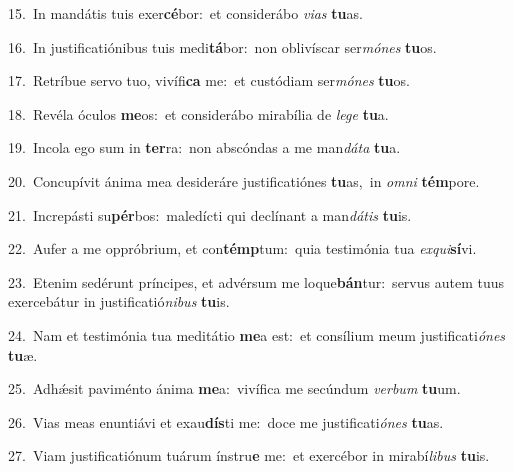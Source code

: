 {\numbfont\textcolor{\numbcolor}{15.}}~In mandátis tuis exer\-\textbf{cé}\-bor:~\star et considerábo \textit{vi}\-\textit{as} \textbf{tu}\-as.\par
{\numbfont\textcolor{\numbcolor}{16.}}~In justificatiónibus tuis medi\-\textbf{tá}\-bor:~\star non oblivíscar ser\-\textit{mó}\-\textit{nes} \textbf{tu}\-os.\par
{\numbfont\textcolor{\numbcolor}{17.}}~Retríbue servo tuo, vivífi\textbf{ca} me:~\star et custódiam ser\-\textit{mó}\-\textit{nes} \textbf{tu}\-os.\par
{\numbfont\textcolor{\numbcolor}{18.}}~Revéla óculos \textbf{me}\-os:~\star et considerábo mirabília de \textit{le}\-\textit{ge} \textbf{tu}\-a.\par
{\numbfont\textcolor{\numbcolor}{19.}}~Incola ego sum in \textbf{ter}\-ra:~\star non abscóndas a me man\-\textit{dá}\-\textit{ta} \textbf{tu}\-a.\par
{\numbfont\textcolor{\numbcolor}{20.}}~Concupívit ánima mea desideráre justificatiónes \textbf{tu}\-as,~\star in \textit{om}\-\textit{ni} \textbf{tém}\-pore.\par
{\numbfont\textcolor{\numbcolor}{21.}}~Increpásti su\-\textbf{pér}\-bos:~\star maledícti qui declínant a man\-\textit{dá}\-\textit{tis} \textbf{tu}\-is.\par
{\numbfont\textcolor{\numbcolor}{22.}}~Aufer a me oppróbrium, et con\-\textbf{témp}\-tum:~\star quia testimónia tua \textit{ex}\-\textit{qui}\textbf{sí}vi.\par
{\numbfont\textcolor{\numbcolor}{23.}}~Etenim sedérunt príncipes, et advérsum me loque\-\textbf{bán}\-tur:~\star servus autem tuus exercebátur in justificatió\-\textit{ni}\-\textit{bus} \textbf{tu}\-is.\par
{\numbfont\textcolor{\numbcolor}{24.}}~Nam et testimónia tua meditátio \textbf{me}\-a est:~\star et consílium meum justificati\-\textit{ó}\-\textit{nes} \textbf{tu}\-æ.\par
{\numbfont\textcolor{\numbcolor}{25.}}~Adhǽsit paviménto ánima \textbf{me}\-a:~\star vivífica me secúndum \textit{ver}\-\textit{bum} \textbf{tu}\-um.\par
{\numbfont\textcolor{\numbcolor}{26.}}~Vias meas enuntiávi et exau\-\textbf{dís}\-ti me:~\star doce me justificati\-\textit{ó}\-\textit{nes} \textbf{tu}\-as.\par
{\numbfont\textcolor{\numbcolor}{27.}}~Viam justificatiónum tuárum ínstru\textbf{e} me:~\star et exercébor in mirabí\-\textit{li}\-\textit{bus} \textbf{tu}\-is.\par
